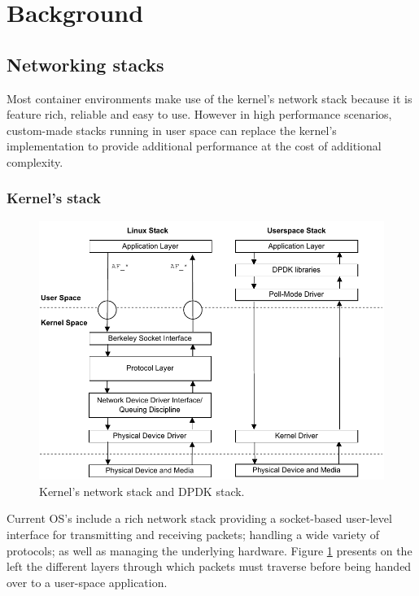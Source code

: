 \documentclass[conference]{IEEEtran}
\begin{document}
\section{Background}
\subsection{Networking stacks}
Most container environments make use of the kernel's network stack because it is feature rich, reliable and easy to use. However in high performance scenarios, custom-made stacks running in user space can replace the kernel's implementation to provide additional performance at the cost of additional complexity.  
\subsubsection{Kernel's stack}
\begin{figure}[!t]
\centering
\includegraphics[scale=0.6]{kernel_stack.pdf}
\caption{Kernel's network stack \cite{kernel_stack} and DPDK stack.}
\label{kernel_stack}
\end{figure}
Current OS's include a rich network stack providing a socket-based user-level interface for transmitting and receiving packets; handling a wide variety of protocols; as well as managing the underlying hardware. Figure \ref{kernel_stack} presents on the left the different layers through which packets must traverse before being handed over to a user-space application.
\end{document}
